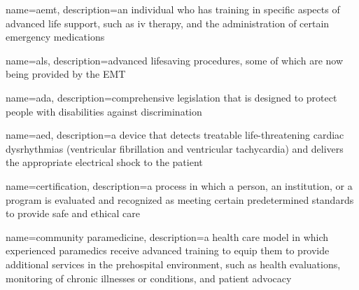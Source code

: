 \documentclass[../EMT-169.tex]{subfiles}
\begin{document}
\setcounter{chapter}{0}
\label{ch:chapter1}
\clearpage

	
	{
		name=\acrfull{aemt},
		description={an individual who has training in specific aspects of advanced life support, such as \acrfull{iv} therapy, and the administration of certain emergency medications}
	}

	{
		name=\acrfull{als},
		description={advanced lifesaving procedures, some of which are now being provided by the EMT}
	}

	{
		name=\acrfull{ada},
		description={comprehensive legislation that is designed to protect people with disabilities against discrimination}
	}
	
	{
		name=\acrfull{aed},
		description={a device that detects treatable life-threatening cardiac dysrhythmias (ventricular fibrillation and ventricular tachycardia) and delivers the appropriate electrical shock to the patient}
	}

	{
		name=certification,
		description={a process in which a person, an institution, or a program is evaluated and recognized as meeting certain predetermined standards to provide safe and ethical care}
	}
	
	{
		name=community paramedicine,
		description={a health care model in which experienced paramedics receive advanced training to equip them to provide additional services in the prehospital environment, such as health evaluations, monitoring of chronic illnesses or conditions, and patient advocacy}
	}
\end{document}
